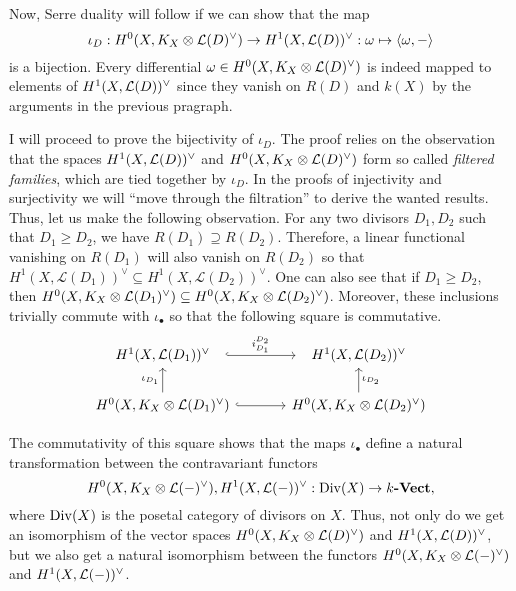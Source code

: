Now, Serre duality will follow if we can show that the map
\[
  \iota_{D}:H^0(X,K_X\otimes\mathcal{L}(D)^{\vee})\to H^1(X,\mathcal{L}(D))^{\vee}
  :\omega\mapsto\langle\omega,-\rangle
\]
is a bijection. Every differential $\omega\in H^0(X,K_X\otimes\mathcal{L}(D)^{\vee})$ is indeed mapped
to elements of $H^1(X,\mathcal{L}(D))^{\vee}$ since they vanish on $R(D)$ and $k(X)$ by the
arguments in the previous pragraph.

I will proceed to prove the bijectivity of $\iota_{D}$. The proof relies
on the observation that the spaces $H^1(X,\mathcal{L}(D))^{\vee}$ and $H^0(X,K_X\otimes\mathcal{L}(D)^{\vee})$ form so called
\emph{filtered families}, which are tied together by $\iota_{D}$. In the
proofs of injectivity and surjectivity we will ``move through the
filtration'' to derive the wanted results. Thus, let us make the following
observation. For any two divisors $D_{1}, D_{2}$ such that $D_{1}\geq D_{2}$,
we have $R(D_{1})\supseteq R(D_{2})$. Therefore, a linear functional
vanishing on $R(D_{1})$ will also vanish on $R(D_{2})$ so that
$H^{1}(X,\mathcal{L}(D_{1}))^{\vee}\subseteq H^{1}(X,\mathcal{L}(D_{2}))^\vee$.
One can also see that if $D_{1}\geq D_{2}$, then $H^0(X,K_X\otimes\mathcal{L}(D_{1})^{\vee})
\subseteq H^0(X,K_X\otimes\mathcal{L}(D_{2})^{\vee})$. Moreover, these inclusions trivially
commute with $\iota_{\bullet}$ so that the following square is commutative.
\begin{equation}\label{eq:iota_square}
  \begin{tikzcd}[column sep=large]
    \dual{D_{1}}\rar[hook, shorten=.7em, "i_{D_{1}}^{D_{2}}"] & \dual{D_{2}} \\
    \diffs{D_{1}}\uar{\iota_{D_{1}}}\rar[hook]
    & \diffs{D_{2}}\uar["\iota_{D_{2}}"']
  \end{tikzcd}
\end{equation}
\begin{cat}
  The commutativity of this square shows that the maps $\iota_{\bullet}$
  define a natural transformation between the contravariant functors
  \[
    H^0(X,K_X\otimes\mathcal{L}(-)^{\vee}),H^1(X,\mathcal{L}(-))^{\vee}:\operatorname{Div}(X)\to k\textbf{-Vect},
  \]
  where $\operatorname{Div}(X)$ is the posetal category of divisors on $X$.
  Thus, not only do we get an isomorphism of the vector spaces
  $H^0(X,K_X\otimes\mathcal{L}(D)^{\vee})$ and $H^1(X,\mathcal{L}(D))^{\vee}$, but we also get a natural isomorphism
  between the functors $H^0(X,K_X\otimes\mathcal{L}(-)^{\vee})$ and $H^1(X,\mathcal{L}(-))^{\vee}$.
\end{cat}


